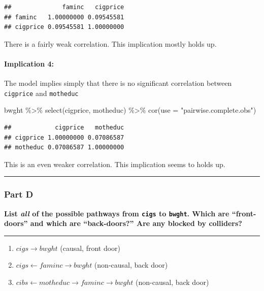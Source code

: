 \documentclass[
]{article}
\newenvironment{Shaded}{\begin{snugshade}}{\end{snugshade}}
\newcommand{\AttributeTok}[1]{\textcolor[rgb]{0.77,0.63,0.00}{#1}}
\newcommand{\FunctionTok}[1]{\textcolor[rgb]{0.00,0.00,0.00}{#1}}
\newcommand{\NormalTok}[1]{#1}
\newcommand{\SpecialCharTok}[1]{\textcolor[rgb]{0.00,0.00,0.00}{#1}}
\newcommand{\StringTok}[1]{\textcolor[rgb]{0.31,0.60,0.02}{#1}}
\providecommand{\tightlist}{%
  \setlength{\itemsep}{0pt}\setlength{\parskip}{0pt}}
\begin{document}
\begin{verbatim}
##              faminc   cigprice
## faminc   1.00000000 0.09545581
## cigprice 0.09545581 1.00000000
\end{verbatim}

There is a fairly weak correlation. This implication mostly holds up.

\hypertarget{implication-4}{%
\paragraph{Implication 4:}\label{implication-4}}

The model implies simply that there is no significant correlation
between \texttt{cigprice} and \texttt{motheduc}

\begin{Shaded}
\begin{Highlighting}[]
\NormalTok{bwght }\SpecialCharTok{\%\textgreater{}\%}
  \FunctionTok{select}\NormalTok{(cigprice, motheduc) }\SpecialCharTok{\%\textgreater{}\%}
  \FunctionTok{cor}\NormalTok{(}\AttributeTok{use =} \StringTok{"pairwise.complete.obs"}\NormalTok{)}
\end{Highlighting}
\end{Shaded}

\begin{verbatim}
##            cigprice   motheduc
## cigprice 1.00000000 0.07086587
## motheduc 0.07086587 1.00000000
\end{verbatim}

This is an even weaker correlation. This implication seems to holds up.

\begin{center}\rule{0.5\linewidth}{0.5pt}\end{center}

\hypertarget{part-d-1}{%
\subsubsection{Part D}\label{part-d-1}}

\textbf{List \emph{all} of the possible pathways from \texttt{cigs} to
\texttt{bwght}. Which are ``front-doors'' and which are ``back-doors?''
Are any blocked by colliders?}

\begin{center}\rule{0.5\linewidth}{0.5pt}\end{center}

\begin{enumerate}
\def\labelenumi{\arabic{enumi}.}
\tightlist
\item
  \(cigs \rightarrow bwght\) (causal, front door)
\item
  \(cigs \leftarrow faminc \rightarrow bwght\) (non-causal, back door)
\item
  \(cibs \leftarrow motheduc \rightarrow faminc \rightarrow bwght\)
  (non-causal, back door)
\end{enumerate}
\end{document}
